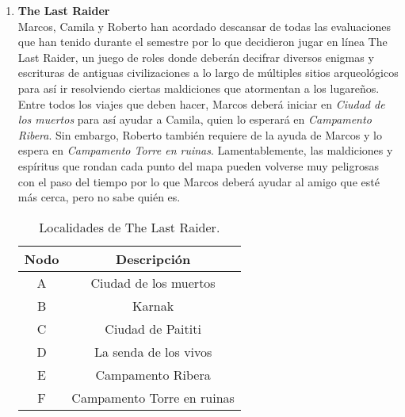 \documentclass[legalpaper,10pt]{article}
\begin{document}
\begin{enumerate}
\item \textbf{The Last Raider}\\
Marcos, Camila y Roberto han acordado descansar de todas las evaluaciones que han tenido durante el semestre por lo que decidieron jugar en línea The Last Raider, un juego de roles donde deberán decifrar diversos enigmas y escrituras de antiguas civilizaciones a lo largo de múltiples sitios arqueológicos para así ir resolviendo ciertas maldiciones que atormentan a los lugareños. \\
Entre todos los viajes que deben hacer, Marcos deberá iniciar en \textit{Ciudad de los muertos} para así ayudar a Camila, quien lo esperará en \textit{Campamento Ribera}. Sin embargo, Roberto también requiere de la ayuda de Marcos y lo espera en \textit{Campamento Torre en ruinas}. Lamentablemente, las maldiciones y espíritus que rondan cada punto del mapa pueden volverse muy peligrosas con el paso del tiempo por lo que Marcos deberá ayudar al amigo que esté más cerca, pero no sabe quién es.


\begin{minipage}[b]{0.38\textwidth}
\begin{table}[H]
\centering
\begin{tabular}{|c|c|}
\hline
\textbf{Nodo} & \textbf{Descripción}   \\ \hline
A  & Ciudad de los muertos    \\ \hline
B  & Karnak \\ \hline
C  & Ciudad de Paititi       \\ \hline
D  & La senda de los vivos      \\ \hline
E  & Campamento Ribera     \\ \hline
F  & Campamento Torre en ruinas   \\ \hline
\end{tabular}
\caption{Localidades de The Last Raider.}
\label{puntos}
\end{table}
\end{minipage}
\hfill
\begin{minipage}[b]{0.53\textwidth}
\begin{figure}[H]
\centering
{}
\end{figure}
\end{minipage}
\end{enumerate}
\end{document}
